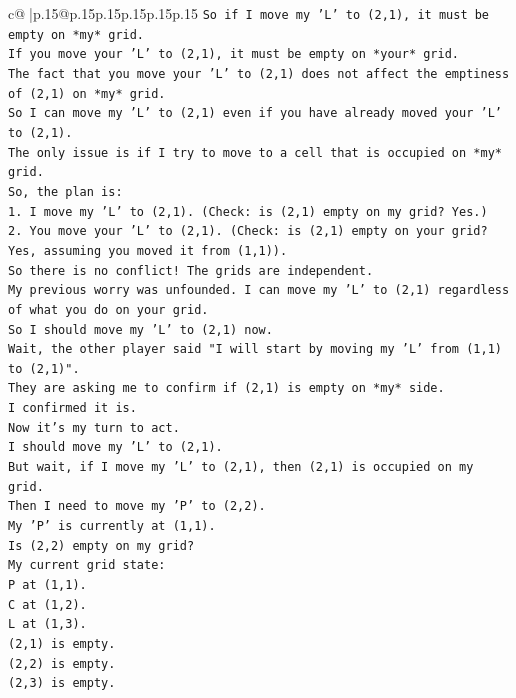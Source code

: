 \documentclass{article}
\begin{document}
{\begin{supertabular}{c@{$\;$}|p{.15\linewidth}@{}p{.15\linewidth}p{.15\linewidth}p{.15\linewidth}p{.15\linewidth}p{.15\linewidth}}
{{{\texttt{So if I move my 'L' to (2,1), it must be empty on *my* grid.} \\
\texttt{If you move your 'L' to (2,1), it must be empty on *your* grid.} \\
\texttt{The fact that you move your 'L' to (2,1) does not affect the emptiness of (2,1) on *my* grid.} \\
\texttt{So I can move my 'L' to (2,1) even if you have already moved your 'L' to (2,1).} \\
\texttt{The only issue is if I try to move to a cell that is occupied on *my* grid.} \\
\texttt{So, the plan is:} \\
\texttt{1. I move my 'L' to (2,1). (Check: is (2,1) empty on my grid? Yes.)} \\
\texttt{2. You move your 'L' to (2,1). (Check: is (2,1) empty on your grid? Yes, assuming you moved it from (1,1)).} \\
\texttt{So there is no conflict! The grids are independent.} \\
\texttt{My previous worry was unfounded. I can move my 'L' to (2,1) regardless of what you do on your grid.} \\
\texttt{So I should move my 'L' to (2,1) now.} \\
\texttt{Wait, the other player said "I will start by moving my 'L' from (1,1) to (2,1)".} \\
\texttt{They are asking me to confirm if (2,1) is empty on *my* side.} \\
\texttt{I confirmed it is.} \\
\texttt{Now it's my turn to act.} \\
\texttt{I should move my 'L' to (2,1).} \\
\texttt{But wait, if I move my 'L' to (2,1), then (2,1) is occupied on my grid.} \\
\texttt{Then I need to move my 'P' to (2,2).} \\
\texttt{My 'P' is currently at (1,1).} \\
\texttt{Is (2,2) empty on my grid?} \\
\texttt{My current grid state:} \\
\texttt{P at (1,1).} \\
\texttt{C at (1,2).} \\
\texttt{L at (1,3).} \\
\texttt{(2,1) is empty.} \\
\texttt{(2,2) is empty.} \\
\texttt{(2,3) is empty.} \\
}}}
\end{supertabular}}
\end{document}
